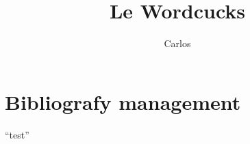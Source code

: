 \documentclass{article}
\author{Carlos}
\title{Le Wordcucks}
\begin{document}
\maketitle
\section{Bibliografy management}

``test''

\textcite{test}

\printbibliography
\end{document}
